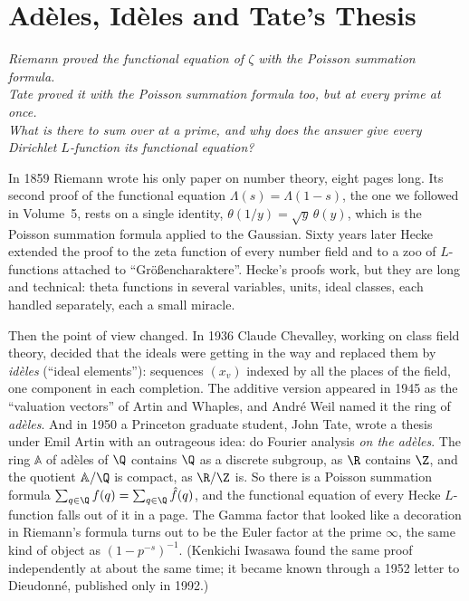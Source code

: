 \chapter{Ad\`eles, Id\`eles and Tate's Thesis}
\begin{center}\itshape
Riemann proved the functional equation of $\zeta$ with the Poisson summation formula.\\
Tate proved it with the Poisson summation formula too, but at every prime at once.\\
What is there to sum over at a prime, and why does the answer give every Dirichlet $L$-function its functional equation?
\end{center}

In 1859 Riemann wrote his only paper on number theory, eight pages long. Its second proof of the functional equation
$\Lambda(s)=\Lambda(1-s)$, the one we followed in Volume~5, rests on a single identity, $\theta(1/y)=\sqrt y\,\theta(y)$, which is
the Poisson summation formula applied to the Gaussian. Sixty years later Hecke extended the proof to the zeta function of every
number field and to a zoo of $L$-functions attached to ``Gr\"o\ss encharaktere''. Hecke's proofs work, but they are long and
technical: theta functions in several variables, units, ideal classes, each handled separately, each a small miracle.

Then the point of view changed. In 1936 Claude Chevalley, working on class field theory, decided that the ideals were getting in the
way and replaced them by \emph{id\`eles} (``ideal elements''): sequences $(x_v)$ indexed by all the places of the field, one
component in each completion. The additive version appeared in 1945 as the ``valuation vectors'' of Artin and Whaples, and Andr\'e Weil named it the ring of \emph{ad\`eles}. And in 1950 a Princeton graduate student,
John Tate, wrote a thesis under Emil Artin with an outrageous idea: do Fourier analysis \emph{on the ad\`eles}. The ring $\mathbb{A}$ of
ad\`eles of $\Q$ contains $\Q$ as a discrete subgroup, as $\R$ contains $\Z$, and the quotient $\mathbb{A}/\Q$ is compact, as $\R/\Z$ is.
So there is a Poisson summation formula $\sum_{q\in\Q}f(q)=\sum_{q\in\Q}\hat f(q)$, and the functional equation of every Hecke
$L$-function falls out of it in a page. The Gamma factor that looked like a decoration in Riemann's formula turns out to be the
Euler factor at the prime $\infty$, the same kind of object as $(1-p^{-s})^{-1}$. (Kenkichi Iwasawa found the same proof
independently at about the same time; it became known through a 1952 letter to Dieudonn\'e, published only in 1992.)

